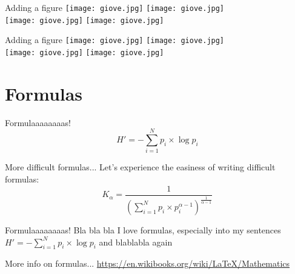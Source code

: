 \documentclass{beamer}
\begin{document}
\begin{frame}{Adding a figure}
\centering
 \texttt{[image: giove.jpg]}
 \texttt{[image: giove.jpg]}\\
 \bigskip
 \texttt{[image: giove.jpg]}
  \texttt{[image: giove.jpg]}\\
\end{frame}

\begin{frame}{Adding a figure}
\centering
 \texttt{[image: giove.jpg]}
 \texttt{[image: giove.jpg]}\\
 \smallskip
 \texttt{[image: giove.jpg]}
  \texttt{[image: giove.jpg]}\\
\end{frame}

\section{Formulas}


\begin{frame}{Formulaaaaaaaas!}
    \begin{equation}
        H' = - \sum_{i=1}^{N} p_i \times \log{p_i}
    \end{equation}
\end{frame}

\begin{frame}{More difficult formulas...}
Let's experience the easiness of writing difficult formulas:
\begin{equation}
K_{\alpha}=\frac{1}{\left( \sum_{i=1}^{N} p_i \times p_i^{\alpha-1} \right)^{\frac{1}{\alpha-1}}} 
\end{equation}
\end{frame}

\begin{frame}{Formulaaaaaaaas!}
Bla bla bla I love formulas, especially into my sentences
$H' = - \sum_{i=1}^{N} p_i \times \log{p_i}$ and blablabla again
\end{frame}

\begin{frame}{More info on formulas...}
\url{https://en.wikibooks.org/wiki/LaTeX/Mathematics}
\end{frame}
\end{document}

